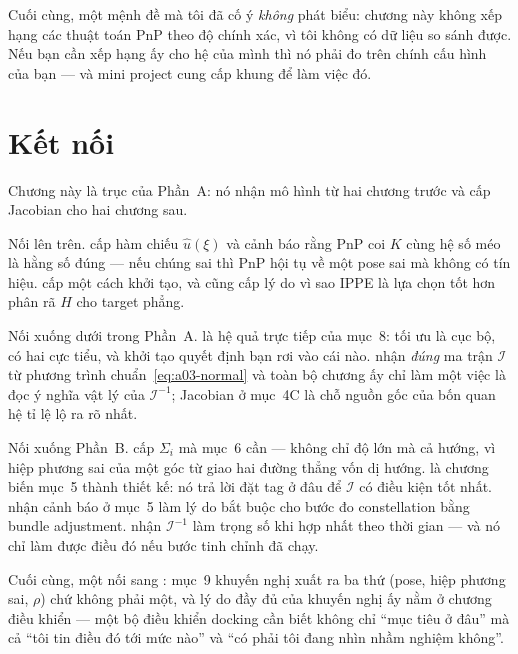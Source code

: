 \documentclass[../../marker.tex]{subfiles}
\begin{document}
Cuối cùng, một mệnh đề mà tôi đã cố ý \emph{không} phát biểu: chương này không xếp hạng các thuật toán PnP theo độ chính xác, vì tôi không có dữ liệu so sánh được. Nếu bạn cần xếp hạng ấy cho hệ của mình thì nó phải đo trên chính cấu hình của bạn --- và mini project cung cấp khung để làm việc đó.

\section{Kết nối}

Chương này là trục của Phần~A: nó nhận mô hình từ hai chương trước và cấp Jacobian cho hai chương sau.

Nối lên trên.  cấp hàm chiếu \(\hat{u}(\xi)\) và cảnh báo rằng PnP coi \(K\) cùng hệ số méo là hằng số đúng --- nếu chúng sai thì PnP hội tụ về một pose sai mà không có tín hiệu.  cấp một cách khởi tạo, và cũng cấp lý do vì sao IPPE là lựa chọn tốt hơn phân rã \(H\) cho target phẳng.

Nối xuống dưới trong Phần~A.  là hệ quả trực tiếp của mục~8: tối ưu là cục bộ, có hai cực tiểu, và khởi tạo quyết định bạn rơi vào cái nào.  nhận \emph{đúng} ma trận \(\mathcal{I}\) từ phương trình chuẩn~\eqref{eq:a03-normal} và toàn bộ chương ấy chỉ làm một việc là đọc ý nghĩa vật lý của \(\mathcal{I}^{-1}\); Jacobian ở mục~4C là chỗ nguồn gốc của bốn quan hệ tỉ lệ lộ ra rõ nhất.

Nối xuống Phần~B.  cấp \(\Sigma_i\) mà mục~6 cần --- không chỉ độ lớn mà cả hướng, vì hiệp phương sai của một góc từ giao hai đường thẳng vốn dị hướng.  là chương biến mục~5 thành thiết kế: nó trả lời đặt tag ở đâu để \(\mathcal{I}\) có điều kiện tốt nhất.  nhận cảnh báo ở mục~5 làm lý do bắt buộc cho bước đo constellation bằng bundle adjustment.  nhận \(\mathcal{I}^{-1}\) làm trọng số khi hợp nhất theo thời gian --- và nó chỉ làm được điều đó nếu bước tinh chỉnh đã chạy.

Cuối cùng, một nối sang : mục~9 khuyến nghị xuất ra ba thứ (pose, hiệp phương sai, \(\rho\)) chứ không phải một, và lý do đầy đủ của khuyến nghị ấy nằm ở chương điều khiển --- một bộ điều khiển docking cần biết không chỉ ``mục tiêu ở đâu'' mà cả ``tôi tin điều đó tới mức nào'' và ``có phải tôi đang nhìn nhầm nghiệm không''.
\end{document}
